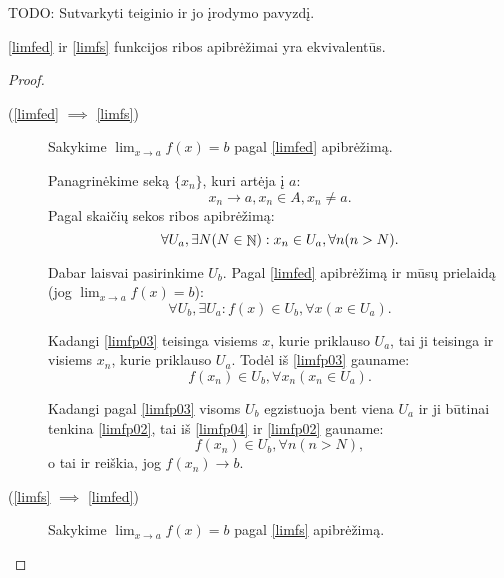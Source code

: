 TODO: Sutvarkyti teiginio ir jo įrodymo pavyzdį.
\begin{prop}
  \ref{limfed} ir \ref{limfs} funkcijos ribos apibrėžimai yra ekvivalentūs.
  \begin{proof}
    \hfill \\
    \begin{description}
      \item[(\ref{limfed} $\implies$ \ref{limfs})] 
        Sakykime $\lim _{x \to a} f(x) = b$ pagal \ref{limfed} apibrėžimą.

        Panagrinėkime seką $\{x_{n}\}$, kuri artėja į $a$:
        \begin{equation}
          x_{n} \to a, x_{n} \in A, x_{n} \neq a.
          \label{limfp01}
        \end{equation}
        Pagal skaičių sekos ribos apibrėžimą:
        \begin{equation}
          \forall U_{a}, \exists N (N \in \NSET) :%
            x_{n} \in U_{a}, \forall n (n > N).
          \label{limfp02}
        \end{equation}

        Dabar laisvai pasirinkime $U_{b}$. Pagal \ref{limfed} apibrėžimą 
        ir mūsų prielaidą (jog $\lim _{x \to a} f(x) = b$):
        \begin{equation}
          \forall U_{b}, \exists U_{a} :%
            f(x) \in U_{b}, \forall x (x \in U_{a}).
          \label{limfp03}
        \end{equation}

        Kadangi \ref{limfp03} teisinga visiems $x$, kurie priklauso $U_{a}$,
        tai ji teisinga ir visiems $x_{n}$, kurie priklauso $U_{a}$. 
        Todėl iš \ref{limfp03} gauname:
        \begin{equation}
          f(x_{n}) \in U_{b}, \forall x_{n} (x_{n} \in U_{a}).
          \label{limfp04}
        \end{equation}

        Kadangi pagal \ref{limfp03} visoms $U_{b}$ egzistuoja bent viena
        $U_{a}$ ir ji būtinai tenkina \ref{limfp02}, tai iš \ref{limfp04}
        ir \ref{limfp02} gauname:
        \begin{equation}
          f(x_{n}) \in U_{b}, \forall n (n > N),
          \label{limfp05}
        \end{equation}
        o tai ir reiškia, jog $f(x_{n}) \to b$.

      \item[(\ref{limfs} $\implies$ \ref{limfed})]
        Sakykime $\lim _{x \to a} f(x) = b$ pagal \ref{limfs} apibrėžimą.


\end{description}
\end{proof}
\end{prop}
